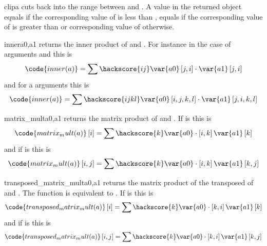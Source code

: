 \begin{funcdesc}{clip}{a}
cuts back  into the range between  and . A value in the returned object equals 
 if the corresponding value of  is less than , equals  if the 
 corresponding value of  is greater than 
or corresponding value of  otherwise.
\end{funcdesc}
\begin{funcdesc}{inner}{a0,a1}
returns the inner product of  and . For instance in the
case of \RankTwo arguments and this is 
\begin{equation}
\code{inner(a)}=\sum\hackscore{ij}\var{a0} \left[j,i\right]  \cdot \var{a1} \left[j,i\right]
\end{equation} 
and for a \RankFour arguments this is
\begin{equation}
\code{inner(a)}=\sum\hackscore{ijkl}\var{a0} \left[i,j,k,l\right]  \cdot \var{a1} \left[j,i,k,l\right]
\end{equation} 
\end{funcdesc}

\begin{funcdesc}{matrix_mult}{a0,a1}
returns the matrix product of  and . If  is \RankOne this is
\begin{equation}
\code{matrix_mult(a)}\left[i\right]=\sum\hackscore{k}\var{a0}  \cdot \left[i,k\right]\var{a1} \left[k\right]
\end{equation} 
and if  is \RankTwo this is
\begin{equation}
\code{matrix_mult(a)}\left[i,j\right]=\sum\hackscore{k}\var{a0}  \cdot \left[i,k\right]\var{a1} \left[k,j\right]
\end{equation} 
\end{funcdesc}

\begin{funcdesc}{transposed_matrix_mult}{a0,a1}
returns the matrix product of the transposed of  and . The function is equivalent to 
.
If  is \RankOne this is
\begin{equation}
\code{transposed_matrix_mult(a)}\left[i\right]=\sum\hackscore{k}\var{a0}  \cdot \left[k,i\right]\var{a1} \left[k\right]
\end{equation} 
and if  is \RankTwo this is
\begin{equation}
\code{transposed_matrix_mult(a)}\left[i,j\right]=\sum\hackscore{k}\var{a0}  \cdot \left[k,i\right]\var{a1} \left[k,j\right]
\end{equation} 
\end{funcdesc}

